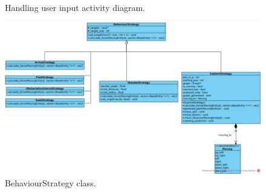 \begin{figure}
    \caption{Handling user input activity diagram.}\label{fig:activitymousehandler}
\end{figure}

\begin{figure}
    \centering
    \includegraphics[angle=-90,origin=c,scale=0.6]{res/steering/BehaviourStrategy.png}
    \caption{BehaviourStrategy class.}\label{fig:behaviourstrategy}
\end{figure}

